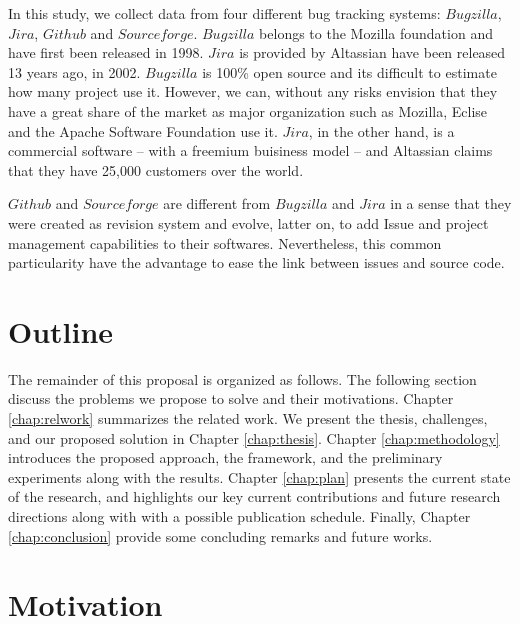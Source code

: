  In this study, we collect data from four different bug tracking systems: $Bugzilla$, $Jira$, $Github$ and $Sourceforge$. $Bugzilla$ belongs to the Mozilla foundation and have first been released in 1998. $Jira$ is provided by Altassian have been released 13 years ago, in 2002. $Bugzilla$ is 100\% open source and its difficult to estimate how many project use it. 
 However, we can, without any risks envision that they have a great share of the market as major organization such as Mozilla, Eclise and the Apache Software Foundation use it.
 $Jira$, in the other hand, is a commercial software -- with a freemium buisiness model -- and Altassian claims that they have 25,000 customers over the world.

 $Github$ and $Sourceforge$ are different from $Bugzilla$ and $Jira$ in a sense that they were created as revision system and evolve, latter on, to add Issue and project management capabilities to their softwares. Nevertheless, this common particularity have the advantage to ease the link between issues and source code. 

\section{Outline\label{sec:outline}}

The remainder of this proposal is organized as follows. The following section discuss the problems we propose to solve and their motivations. Chapter \ref{chap:relwork} summarizes the related work. 
We present the thesis, challenges, and our proposed solution in Chapter \ref{chap:thesis}. 
Chapter \ref{chap:methodology} introduces the proposed approach, the framework, and the preliminary experiments along with the results. 
Chapter \ref{chap:plan} presents the current state of the research, and highlights our key current contributions and future research directions along with with a possible publication schedule.
Finally, Chapter \ref{chap:conclusion} provide some concluding remarks and future works. 

\section{Motivation}

